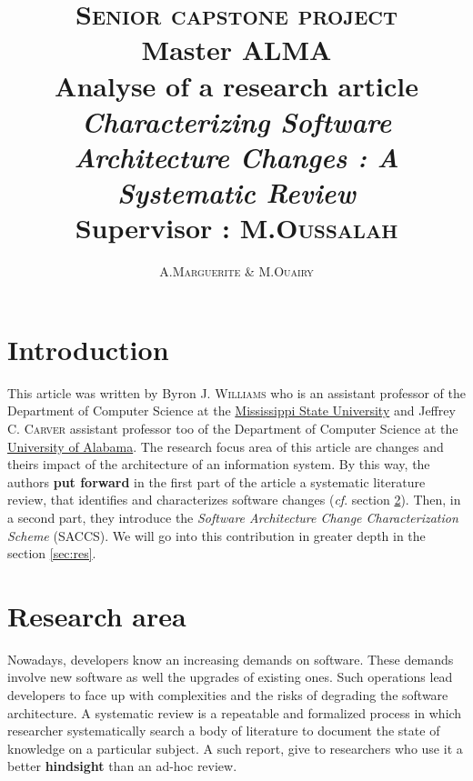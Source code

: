 \documentclass[12pt]{article}
\title{ {\huge \textsc{Senior capstone project}} \\  Master ALMA  \\ \textbf{Analyse of a research article} \\ \emph{Characterizing Software Architecture Changes : A Systematic Review}\\{\small Supervisor :  M.\textsc{Oussalah}}}
\author{A.\textsc{Marguerite} \& M.\textsc{Ouairy}}
\newcommand{\cf}{\emph{cf}.}
\begin{document}
\maketitle
\renewcommand{\labelitemi}{$\bullet$} 



\section{Introduction}\label{sec:intro}
This article was written by Byron J. \textsc{Williams} who is an assistant professor of the Department of Computer Science at the \href{http://www.msstate.edu/}{Mississippi State University} and Jeffrey C. \textsc{Carver} assistant professor too of the Department of Computer Science at the \href{http://www.ua.edu/}{University of Alabama}. The research focus area of this article are changes and theirs impact of the architecture of an information system. By this way, the authors \textbf{put forward} in the first part of the article a systematic literature review, that identifies and characterizes software changes (\cf{} section \ref{sec:pblm}). Then, in a second part, they introduce the \emph{Software Architecture Change Characterization Scheme} (SACCS). We will go into this contribution in greater depth in the section \ref{sec:res}. 



\section{Research area}\label{sec:pblm}
Nowadays, developers know an increasing demands on software. These demands involve new software as well the upgrades of existing ones. Such operations lead developers to face up with complexities and the risks of degrading the software architecture. A systematic review is a repeatable and formalized process in which researcher systematically search a body of literature to document the state of knowledge on a particular subject. A such report, give to researchers who use it a better \textbf{hindsight} than an ad-hoc review.%
\end{document}
